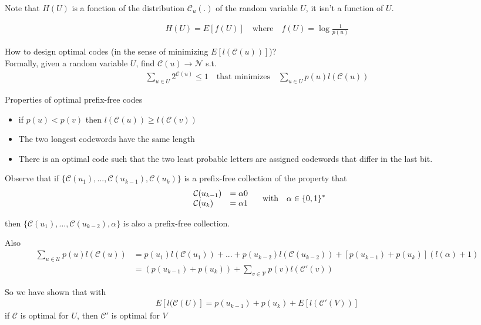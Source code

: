 \documentclass[twoside]{article}
\theoremstyle{definition} %
\def\V{\mathcal{V}}
\def\U{\mathcal{U}}
\def\N{\mathcal{N}}
\def\C{\mathcal{C}}
\begin{document}
Note that $H(U)$ is a fonction of the distribution $\C_u(.)$ of the random variable $U$, it isn't a function of $U$.

\begin{align*}
  H(U) = E[f(U)] \quad \text{where} \quad f(U) = \log \frac{1}{p(u)}
\end{align*}

How to design optimal codes (in the sense of minimizing $E[l(\C(u))]$)? \\
Formally, given a random variable $U$, find $\C(u) \rightarrow \N$ s.t.
\begin{align*}
  \sum_{u \in U} 2^{\C(u)} \leq 1
\quad \text{that minimizes} \quad
  \sum_{u \in U} p(u)l(\C(u))
\end{align*}

Properties of optimal prefix-free codes
\begin{itemize}
  \item if $p(u) < p(v)$ then $l(\C(u)) \geq l(\C(v))$
  \item The two longest codewords have the same length
  \item There is an optimal code such that the two least probable letters are assigned codewords that differ in the last bit.
\end{itemize}

Observe that if $\{\C(u_1), ... , \C(u_{k-1}), \C(u_k)\}$ is a prefix-free collection of the property that
\begin{align*}
\left.
\begin{array}{l l}
  \C(u_{k-1}) &= \alpha 0 \\
  \C(u_k)     &= \alpha 1
\end{array}
\right.
\quad \text{with} \quad \alpha \in \{ 0, 1\}^*
\end{align*}

then $\{\C(u_1), ..., \C(u_{k-2}), \alpha\}$ is also a prefix-free collection.

Also
\begin{align*}
  \sum_{u \in \U} p(u) l(\C(u)) &= p(u_1) l(\C(u_1)) + ... +  p(u_{k-2}) l(\C(u_{k-2}))
  + [p(u_{k-1}) + p(u_k)](l(\alpha) + 1) \\
  &= (p(u_{k-1}) + p(u_k)) + \sum_{v \in \V} p(v) l(\C'(v))
\end{align*}

So we have shown that with
\begin{align*}
  E[l(\C(U)] = p(u_{k-1}) + p(u_k) + E[l(\C'(V))]
\end{align*}
if $\C$ is optimal for $U$, then $\C'$ is optimal for $V$
\end{document}
